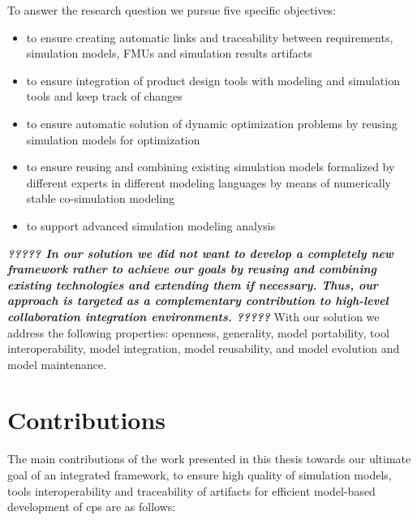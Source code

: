 To answer the research question we pursue five specific objectives: 
\begin{itemize}

 \item to ensure creating automatic links and traceability between requirements, simulation models, FMUs  and simulation results artifacts 
 \item to ensure integration of product design tools with modeling and simulation tools and keep track of changes
 \item to ensure automatic solution of dynamic optimization problems by reusing simulation models for optimization  
 \item to ensure reusing and combining existing simulation models formalized by different experts in different modeling languages by means of numerically stable co-simulation modeling 
 \item to support advanced simulation modeling analysis 

\end{itemize}

\textbf{ \textit{????? In our solution we did not want to develop a completely new framework rather to achieve our goals by reusing and combining existing technologies and extending them if necessary. Thus, our approach is targeted as a complementary contribution to high-level collaboration integration environments. ????? }} With our solution we address the following properties: openness, generality, model portability, tool interoperability, model integration, model reusability, and model evolution and model maintenance.

\section{Contributions}
\label{sec:Contributions}

The main contributions of the work presented in this thesis towards our ultimate goal of an integrated framework, to ensure high quality of simulation models, tools interoperability and traceability of artifacts for efficient model-based development of \acrshort{cps} are as follows:

